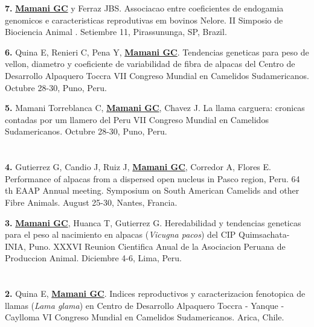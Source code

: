\documentclass[margin,line,10pt]{res}
\newenvironment{list1}{
  \begin{list}{\ding{113}}{%
      \setlength{\itemsep}{0in}
      \setlength{\parsep}{0in} \setlength{\parskip}{0in}
      \setlength{\topsep}{0in} \setlength{\partopsep}{0in} 
      \setlength{\leftmargin}{0.17in}}}{\end{list}}
\begin{document}
\begin{resume}
\begin{list1}
\item [\bf{7}.] {\bf \underline{Mamani GC}} y Ferraz JBS. 
Associacao entre coeficientes de endogamia genomicos e caracteristicas reprodutivas em bovinos Nelore.
II Simposio de Biociencia Animal . Setiembre 11, Pirassununga, SP, Brazil. 
\vspace{0.5cm}

\item [\bf{6}.] Quina E, Renieri C, Pena Y, {\bf \underline{Mamani GC}}.
Tendencias geneticas para peso de vellon, diametro y coeficiente de variabilidad de fibra de alpacas del Centro de Desarrollo Alpaquero Toccra
VII Congreso Mundial en Camelidos Sudamericanos. Octubre 28-30, Puno, Peru. 
\vspace{0.5cm}

\item [\bf{5}.] Mamani Torreblanca C, {\bf \underline{Mamani GC}}, Chavez J.
La llama carguera: cronicas contadas por um llamero del Peru
VII Congreso Mundial en Camelidos Sudamericanos. Octubre 28-30, Puno, Peru. 
\end{list1}
\vspace{0.5cm}

\section{}
\begin{list1}
\item [\bf{4}.] Gutierrez G, Candio J, Ruiz J, {\bf \underline{Mamani GC}}, Corredor A, Flores E.
Performance of alpacas from a dispersed open nucleus in Pasco region, Peru.
64 th EAAP Annual meeting. Symposium on South American Camelids and other Fibre Animals. August 25-30, Nantes, Francia. 
\vspace{0.5cm}

\item [\bf{3}.] {\bf \underline{Mamani GC}}, Huanca T, Gutierrez G.
Heredabilidad y tendencias geneticas para el peso al nacimiento en alpacas (\textit{Vicugna pacos}) del CIP Quimsachata-INIA, Puno.
XXXVI Reunion Cientifica Anual de la Asociacion Peruana de Produccion Animal. Diciembre 4-6, Lima, Peru. 
\end{list1}
\vspace{0.5cm}

\section{}
\begin{list1}
\item [\bf{2}.] Quina E, {\bf \underline{Mamani GC}}.
Indices reproductivos y caracterizacion fenotopica de llamas (\textit{Lama glama}) en Centro de Desarrollo Alpaquero Toccra - Yanque -Caylloma
VI Congreso Mundial en Camelidos Sudamericanos. Arica, Chile. 
\end{list1}
\vspace{0.5cm}


\end{resume}
\end{document}

